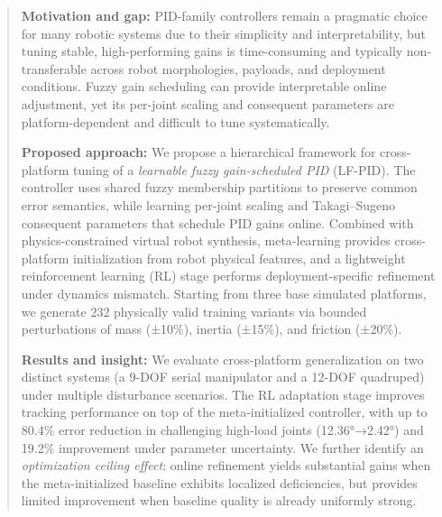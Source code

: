 \documentclass[a4paper]{cas-sc}
\begin{document}
\begin{abstract}
    	\textbf{Motivation and gap:} PID-family controllers remain a pragmatic choice for many robotic systems due to their simplicity and interpretability, but tuning stable, high-performing gains is time-consuming and typically non-transferable across robot morphologies, payloads, and deployment conditions. Fuzzy gain scheduling can provide interpretable online adjustment, yet its per-joint scaling and consequent parameters are platform-dependent and difficult to tune systematically.



        	\textbf{Proposed approach:} We propose a hierarchical framework for cross-platform tuning of a \emph{learnable fuzzy gain-scheduled PID} (LF-PID). The controller uses shared fuzzy membership partitions to preserve common error semantics, while learning per-joint scaling and Takagi--Sugeno consequent parameters that schedule PID gains online. Combined with physics-constrained virtual robot synthesis, meta-learning provides cross-platform initialization from robot physical features, and a lightweight reinforcement learning (RL) stage performs deployment-specific refinement under dynamics mismatch. Starting from three base simulated platforms, we generate 232 physically valid training variants via bounded perturbations of mass (±10\%), inertia (±15\%), and friction (±20\%).



        	\textbf{Results and insight:} We evaluate cross-platform generalization on two distinct systems (a 9-DOF serial manipulator and a 12-DOF quadruped) under multiple disturbance scenarios. The RL adaptation stage improves tracking performance on top of the meta-initialized controller, with up to 80.4\% error reduction in challenging high-load joints (12.36°→2.42°) and 19.2\% improvement under parameter uncertainty. We further identify an \textit{optimization ceiling effect}: online refinement yields substantial gains when the meta-initialized baseline exhibits localized deficiencies, but provides limited improvement when baseline quality is already uniformly strong.
\end{abstract}
\end{document}
